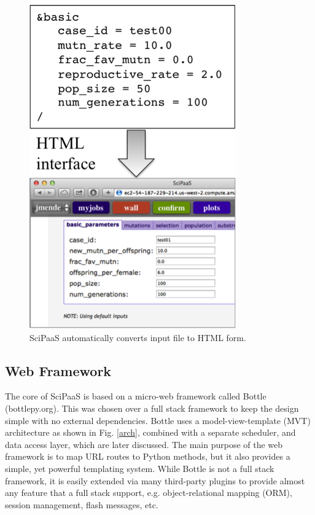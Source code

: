 \documentclass[10pt,reprint]{socc14}
\begin{document}
\begin{figure}[t]
\centering
\includegraphics[natwidth=336,natheight=527]{figs/interface.png}
\caption{SciPaaS automatically converts input file to HTML form. \label{interface}}
\end{figure}

\subsection{Web Framework}

The core of SciPaaS is based on a micro-web framework called Bottle (bottlepy.org).  This was chosen over a full stack framework to keep the design simple with no external dependencies.  Bottle uses a model-view-template (MVT) architecture as shown in Fig. \ref{arch}, combined with a separate scheduler, and data access layer, which are later discussed.  The main purpose of the web framework is to map URL routes to Python methods, but it also provides a simple, yet powerful templating system.  While Bottle is not a full stack framework, it is easily extended via many third-party plugins to provide almost any feature that a full stack support, e.g. object-relational mapping (ORM), session management, flash messages, etc.
\end{document}
